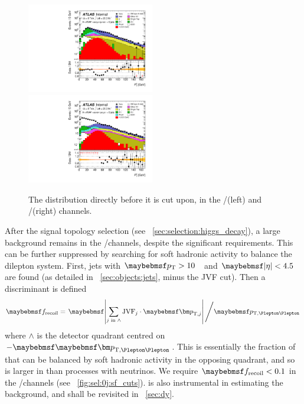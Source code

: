 \begin{figure}
	\includegraphics[width=0.495\textwidth]{tex/selection/emme_CutDPhillMET_0jet_Ptll_mh125_log}
	\hfill
	\includegraphics[width=0.495\textwidth]{tex/selection/eemm_CutDPhillMET_0jet_Ptll_mh125_log}
	\caption{The \ptll distribution directly before it is cut upon, in the \emch/\mech (left) 
	and \eech/\mmch (right) channels.}
	\label{fig:sel:0j:ptll}
\end{figure}

After the signal topology selection (see \Section~\ref{sec:selection:higgs_decay}), a 
large \DYll background remains in the \eech/\mmch channels, despite the significant \met 
requirements. This can be further suppressed by searching for soft hadronic activity to 
balance the dilepton system. First, jets with \unit{$\pt > 10$}{\GeV} and $\mods{\eta} < 
4.5$ are found (as detailed in \Section~\ref{sec:objects:jets}, minus the JVF cut). 
Then a discriminant is defined
\begin{equation}
	\frecoil = \left. \mods{\sum\limits_{j\text{ in }\wedge} \text{JVF}_{j} \cdot \bvec{p}_{\text{T,}j}} \, \middle/ \ptll \right.
	\label{eq:frecoil}
\end{equation}
where $\wedge$ is the detector quadrant centred on $-\ptllvec$. This is essentially the 
fraction of \ptll that can be balanced by soft hadronic activity in the opposing quadrant,
and so is larger in \DYll than processes with neutrinos. We require $\frecoil < 0.1$ in 
the \eech/\mmch channels (see \Figure~\ref{fig:sel:0j:sf_cuts}). \frecoil is also 
instrumental in estimating the \DYll background, and shall be revisited in 
\Section~\ref{sec:dy}.


